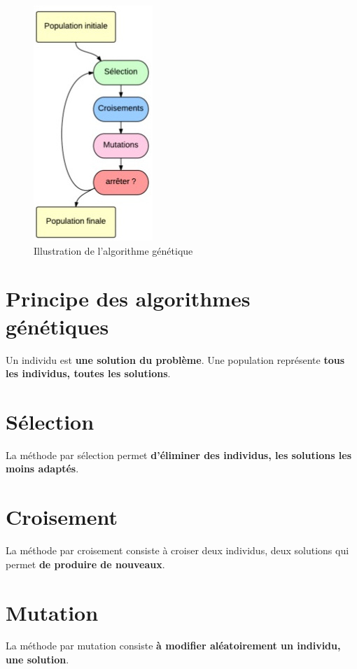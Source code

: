 \documentclass[12pt]{report}
\begin{document}
\begin{figure}[H]
\centering
\includegraphics[scale=0.74]{img/algo-genetic}
\caption{Illustration de l'algorithme génétique}
\end{figure}

\section{Principe des algorithmes génétiques}

Un individu est \textbf{une solution du problème}. Une population représente \textbf{tous les individus, toutes les solutions}.


\section{Sélection}

La méthode par sélection permet \textbf{d'éliminer des individus, les solutions les moins adaptés}.

\section{Croisement}

La méthode par croisement consiste à croiser deux individus, deux solutions qui permet \textbf{de produire de nouveaux}.

\section{Mutation}

La méthode par mutation consiste \textbf{à modifier aléatoirement un individu, une solution}.
\end{document}
